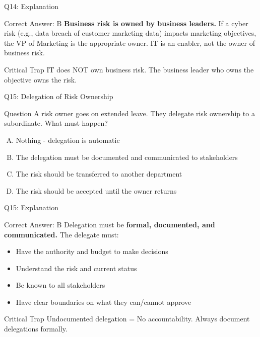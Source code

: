 \documentclass{beamer}
\begin{document}
	\begin{frame}{Q14: Explanation}
		\begin{block}{Correct Answer: B}
			\textbf{Business risk is owned by business leaders.} If a cyber risk (e.g., data breach of customer marketing data) impacts marketing objectives, the VP of Marketing is the appropriate owner. IT is an enabler, not the owner of business risk.
		\end{block}
		\begin{alertblock}{Critical Trap}
			IT does NOT own business risk.
			The business leader who owns the objective owns the risk.
		\end{alertblock}
	\end{frame}
	
	\begin{frame}{Q15: Delegation of Risk Ownership}
		\begin{block}{Question}
			A risk owner goes on extended leave. They delegate risk ownership to a subordinate. What must happen?
		\end{block}
		\begin{enumerate}[(A)]
			\item Nothing - delegation is automatic
			\item The delegation must be documented and communicated to stakeholders
			\item The risk should be transferred to another department
			\item The risk should be accepted until the owner returns
		\end{enumerate}
	\end{frame}
	
	\begin{frame}{Q15: Explanation}
		\begin{block}{Correct Answer: B}
			Delegation must be \textbf{formal, documented, and communicated.} The delegate must:
			\begin{itemize}
				\item Have the authority and budget to make decisions
				\item Understand the risk and current status
				\item Be known to all stakeholders
				\item Have clear boundaries on what they can/cannot approve
			\end{itemize}
		\end{block}
		\begin{alertblock}{Critical Trap}
			Undocumented delegation = No accountability.
			Always document delegations formally.
		\end{alertblock}
	\end{frame}
	
\end{document}
